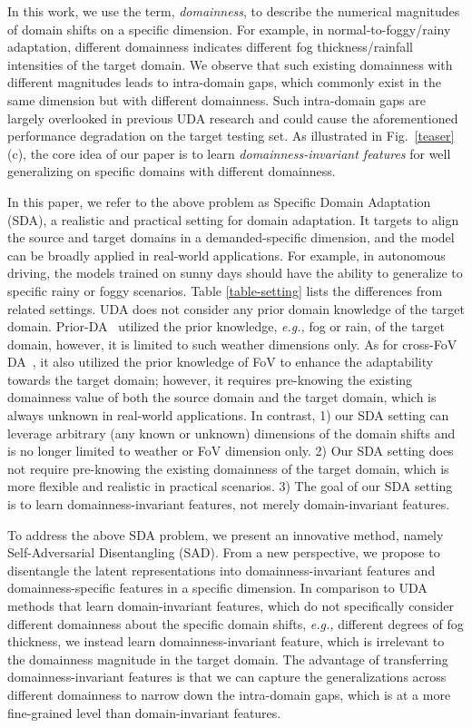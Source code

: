 \documentclass[10pt,journal,compsoc]{IEEEtran}
\begin{document}
In this work, we use the term, \textit{domainness}, to describe the numerical magnitudes of domain shifts on a specific dimension. For example, in normal-to-foggy/rainy adaptation, different domainness indicates different fog thickness/rainfall intensities of the target domain. 
We observe that such existing domainness with different magnitudes leads to intra-domain gaps, which commonly exist in the same dimension but with different domainness. Such intra-domain gaps are largely overlooked in previous UDA research and could cause the aforementioned performance degradation on the target testing set. As illustrated in Fig.~\ref{teaser} (c), the core idea of our paper is to learn \textit{domainness-invariant features} for well generalizing on specific domains with different domainness. 

In this paper, we refer to the above problem as Specific Domain Adaptation (SDA), a realistic and practical setting for domain adaptation. It targets to align the source and target domains in a demanded-specific dimension, and the model can be broadly applied in real-world applications. For example, in autonomous driving, the models trained on sunny days should have the ability to generalize to specific rainy or foggy scenarios. 
Table \ref{table-setting} lists the differences from related settings. UDA does not consider any prior domain knowledge of the target domain. Prior-DA~\cite{sindagi2019prior} utilized the prior knowledge, \emph{e.g.,} fog or rain, of the target domain, however, it is limited to such weather dimensions only. As for cross-FoV DA~\cite{PIT}, it also utilized the prior knowledge of FoV to enhance the adaptability towards the target domain; however, it requires pre-knowing the existing domainness value of both the source domain and the target domain, which is always unknown in real-world applications. In contrast, 1) our SDA setting can leverage arbitrary (any known or unknown) dimensions of the domain shifts and is no longer limited to weather  or FoV dimension only. 2) Our SDA setting does not require pre-knowing the existing domainness of the target domain, which is more flexible and realistic in practical scenarios. 3) The goal of our SDA setting is to learn  domainness-invariant features, not merely domain-invariant features. 


To address the above SDA problem, we present an innovative method, namely Self-Adversarial Disentangling (SAD). From a new perspective, we propose to disentangle the latent representations into domainness-invariant features and domainness-specific features in a specific dimension. 
In comparison to UDA methods that learn domain-invariant features, which do not specifically consider different domainness about the specific domain shifts, \emph{e.g.,} different degrees of fog thickness, we instead learn domainness-invariant feature, which is irrelevant to the domainness magnitude in the target domain. 
The advantage of transferring domainness-invariant features is that we can capture the generalizations across different domainness to narrow down the intra-domain gaps, which is at a more fine-grained level than domain-invariant features. 
\end{document}

